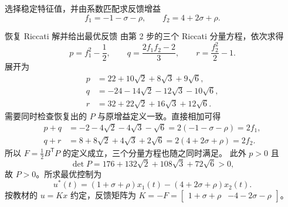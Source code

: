 \documentclass[11pt]{article}
\begin{document}
\begin{solution}
\begin{proofstep}{选择稳定特征值，并由系数匹配求反馈增益}
\[
 \boxed{f_1=-1-\sigma-\rho,\qquad f_2=4+2\sigma+\rho.}
\]
\end{proofstep}
\begin{proofstep}{恢复 Riccati 解并给出最优反馈}
由第 2 步的三个 Riccati 分量方程，依次求得
\[
 p=f_1^2-\frac12,\qquad
 q=\frac{2f_1f_2-2}{3},\qquad
 r=\frac{f_2^2}{2}-1.
\]
展开为
\[
 \begin{aligned}
 p&=22+10\sqrt2+8\sqrt3+9\sqrt6,\\
 q&=-24-14\sqrt2-12\sqrt3-10\sqrt6,\\
 r&=32+22\sqrt2+16\sqrt3+12\sqrt6.
 \end{aligned}
\]
需要同时检查恢复出的 $P$ 与原增益定义一致。直接相加可得
\[
 \begin{aligned}
 p+q&=-2-4\sqrt2-4\sqrt3-\sqrt6
     =2(-1-\sigma-\rho)=2f_1,\\
 q+r&=8+8\sqrt2+4\sqrt3+2\sqrt6
     =2(4+2\sigma+\rho)=2f_2.
 \end{aligned}
\]
所以 $F=\tfrac12 B^{\mathsf T}P$ 的定义成立，三个分量方程也随之同时满足。
此外 $p>0$ 且
\[
 \det P=176+132\sqrt2+108\sqrt3+72\sqrt6>0,
\]
故 $P>0$。所求最优控制为
\[
 \boxed{u^*(t)=(1+\sigma+\rho)x_1(t)
 -(4+2\sigma+\rho)x_2(t).}
\]
按教材的 $u=Kx$ 约定，反馈矩阵为
$K=-F=\begin{bmatrix}1+\sigma+\rho&-4-2\sigma-\rho\end{bmatrix}$。
\end{proofstep}


\end{solution}
\end{document}
